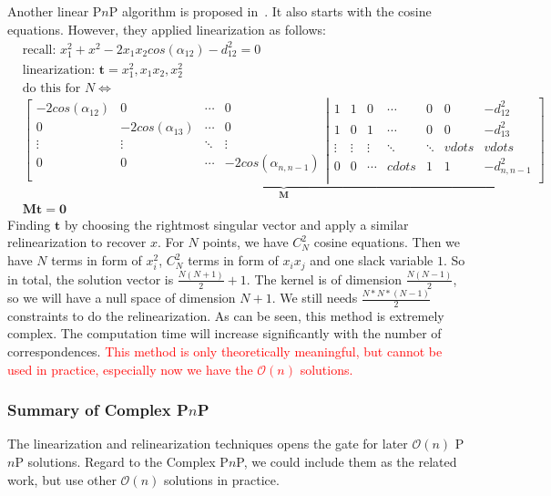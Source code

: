\documentclass[a4paper]{report}
\begin{document}
Another linear P$n$P algorithm is proposed in~\cite{ansar2003linear}. It also starts with the cosine equations. However, they applied linearization as follows:
\begin{align*}
&\text{recall: } x_1^2+x^2-2x_1x_2cos(\alpha_{12})-d_{12}^2=0 \\
&\text{linearization: $\mathbf{t}={x_1^2, x_1x_2, x_2^2}$} \\
&\text{do this for $N$} \Leftrightarrow \\
&\underbrace{
\left[
\begin{matrix}
-2cos(\alpha_{12}) & 0 & \cdots & 0 \\
0 & -2cos(\alpha_{13}) & \cdots & 0 \\
\vdots & \vdots & \ddots & \vdots \\
0 & 0 & \cdots & -2cos(\alpha_{n, n-1})\\
\end{matrix}
\right.
\left|
\begin{matrix}
1 & 1 & 0 & \cdots & 0 & 0 & -d_{12}^2\\
1 & 0 & 1 & \cdots & 0 & 0 & -d_{13}^2\\
\vdots & \vdots & \vdots& \ddots & \ddots & vdots & vdots \\
0 & 0 & \cdots & cdots & 1 & 1 & -d_{n, n-1}^2\\
\end{matrix}
\right]
}_{\mathbf{M}} \\
&\mathbf{M}\mathbf{t} = \mathbf{0}
\end{align*}
Finding $\mathbf{t}$ by choosing the rightmost singular vector and apply a similar relinearization to recover $x$. For $N$ points, we have $C_{N}^2$ cosine equations. Then we have $N$ terms in form of $x_i^2$, $C_{N}^2$ terms in form of $x_ix_j$ and one slack variable $1$. So in total, the solution vector is $\frac{N(N+1)}{2}+1$. The kernel is of dimension $\frac{N(N-1)}{2}$, so we will have a null space of dimension $N+1$. We still needs $\frac{N*N*(N-1)}{2}$ constraints to do the relinearization. As can be seen, this method is extremely complex. The computation time will increase significantly with the number of correspondences. \textcolor{red}{This method is only theoretically meaningful, but cannot be used in practice, especially now we have the $\mathcal{O}(n)$ solutions.}

\subsubsection{Summary of Complex P$n$P}
The linearization and relinearization techniques opens the gate for later $\mathcal{O}(n)$ P$n$P solutions. Regard to the Complex P$n$P, we could include them as the related work, but use other $\mathcal{O}(n)$ solutions in practice.
\end{document}
